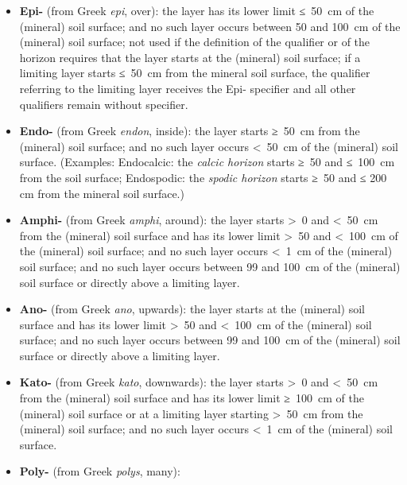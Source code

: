 \documentclass[
  letterpaper,
  DIV=11,
  numbers=noendperiod]{scrreprt}
\begin{document}
\begin{enumerate}
  \begin{itemize}
  \item
    \textbf{Epi-} (from Greek \emph{epi}, over): the layer has its lower
    limit ≤~50~cm of the (mineral) soil surface; and no such layer
    occurs between 50 and 100~cm of the (mineral) soil surface; not used
    if the definition of the qualifier or of the horizon requires that
    the layer starts at the (mineral) soil surface; if a limiting layer
    starts ≤~50~cm from the mineral soil surface, the qualifier
    referring to the limiting layer receives the Epi- specifier and all
    other qualifiers remain without specifier.
  \item
    \textbf{Endo-} (from Greek \emph{endon}, inside): the layer starts
    ≥~50~cm from the (mineral) soil surface; and no such layer occurs
    \textless~50~cm of the (mineral) soil surface. (Examples:
    Endocalcic: the \emph{calcic horizon} starts ≥~50 and ≤~100~cm from
    the soil surface; Endospodic: the \emph{spodic horizon} starts ≥~50
    and ≤ 200 cm from the mineral soil surface.)
  \item
    \textbf{Amphi-} (from Greek \emph{amphi}, around): the layer starts
    \textgreater~0 and \textless~50~cm from the (mineral) soil surface
    and has its lower limit \textgreater~50 and \textless~100~cm of the
    (mineral) soil surface; and no such layer occurs \textless~1~cm of
    the (mineral) soil surface; and no such layer occurs between 99 and
    100~cm of the (mineral) soil surface or directly above a limiting
    layer.
  \item
    \textbf{Ano-} (from Greek \emph{ano}, upwards): the layer starts at
    the (mineral) soil surface and has its lower limit \textgreater~50
    and \textless~100~cm of the (mineral) soil surface; and no such
    layer occurs between 99 and 100~cm of the (mineral) soil surface or
    directly above a limiting layer.
  \item
    \textbf{Kato-} (from Greek \emph{kato}, downwards): the layer starts
    \textgreater~0 and \textless~50~cm from the (mineral) soil surface
    and has its lower limit ≥~100~cm of the (mineral) soil surface or at
    a limiting layer starting \textgreater~50~cm from the (mineral) soil
    surface; and no such layer occurs \textless~1~cm of the (mineral)
    soil surface.
  \item
    \textbf{Poly-} (from Greek \emph{polys}, many):


\end{itemize}
\end{enumerate}
\end{document}
